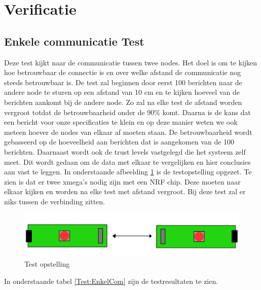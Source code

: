 \section{Verificatie}


\subsection{Enkele communicatie Test}
Deze test kijkt naar de communicatie tussen twee nodes. Het doel is om te kijken hoe betrouwbaar de connectie is en 
over welke afstand de communicatie nog steeds betrouwbaar is. De test zal beginnen door eerst 100 berichten naar de andere 
node te sturen op een afstand van 10 cm en te kijken hoeveel van de berichten aankomt bij de andere node. Zo zal na elke test de 
afstand worden vergroot totdat de betrouwbaarheid onder de 90\% komt. Daarna is de kans dat een bericht voor onze specificaties te 
klein en op deze manier weten we ook meteen hoever de nodes van elkaar af moeten staan. De betrouwbaarheid wordt gebasseerd op de 
hoeveelheid aan berichten dat is aangekomen van de 100 berichten. Daarnaast wordt ook de trust levels vastgelegd 
die het systeem zelf meet. Dit wordt gedaan om de data met elkaar te vergelijken en hier conclusies aan vast te leggen.
In onderstaande afbeelding \ref{fig:TestCom} is de testopstelling opgezet. Te zien is dat er twee xmega's nodig zijn met een NRF chip. 
Deze moeten naar elkaar kijken en worden na elke test met afstand vergroot. Bij deze test zal er niks tussen de verbinding zitten.
\begin{figure}[h]
    \centering
    \includegraphics{img/Screenshot_292.png}
    \caption{Test opstelling}
    \label{fig:TestCom}
\end{figure}
In onderstaande tabel \ref{Test:EnkelCom} zijn de testresultaten te zien.
